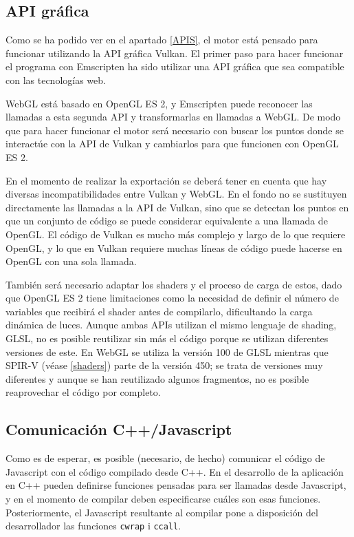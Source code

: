 \subsection{API gráfica}
\label{emscripten_gapi}
Como se ha podido ver en el apartado \ref{APIS}, el motor está pensado para funcionar utilizando la API gráfica Vulkan. El primer paso para hacer funcionar el programa con Emscripten ha sido utilizar una API gráfica que sea compatible con las tecnologías web.

WebGL está basado en OpenGL ES 2, y Emscripten puede reconocer las llamadas a esta segunda API y transformarlas en llamadas a WebGL. De modo que para hacer funcionar el motor será necesario con buscar los puntos donde se interactúe con la API de Vulkan y cambiarlos para que funcionen con OpenGL ES 2.

En el momento de realizar la exportación se deberá tener en cuenta que hay diversas incompatibilidades entre Vulkan y WebGL. En el fondo no se sustituyen directamente las llamadas a la API de Vulkan, sino que se detectan los puntos en que un conjunto de código se puede considerar equivalente a una llamada de OpenGL. El código de Vulkan es mucho más complejo y largo de lo que requiere OpenGL, y lo que en Vulkan requiere muchas líneas de código puede hacerse en OpenGL con una sola llamada.

También será necesario adaptar los shaders y el proceso de carga de estos, dado que OpenGL ES 2 tiene limitaciones como la necesidad de definir el número de variables que recibirá el shader antes de compilarlo, dificultando la carga dinámica de luces. Aunque ambas APIs utilizan el mismo lenguaje de shading, GLSL, no es posible reutilizar sin más el código porque se utilizan diferentes versiones de este. En WebGL se utiliza la versión 100 de GLSL mientras que SPIR-V (véase \ref{shaders}) parte de la versión 450; se trata de versiones muy diferentes y aunque se han reutilizado algunos fragmentos, no es posible reaprovechar el código por completo.


\subsection{Comunicación C++/Javascript}
\label{emscripten_comm}
Como es de esperar, es posible (necesario, de hecho) comunicar el código de Javascript con el código compilado desde C++. En el desarrollo de la aplicación en C++ pueden definirse funciones pensadas para ser llamadas desde Javascript, y en el momento de compilar deben especificarse cuáles son esas funciones. Posteriormente, el Javascript resultante al compilar pone a disposición del desarrollador las funciones \texttt{cwrap} i \texttt{ccall}.

